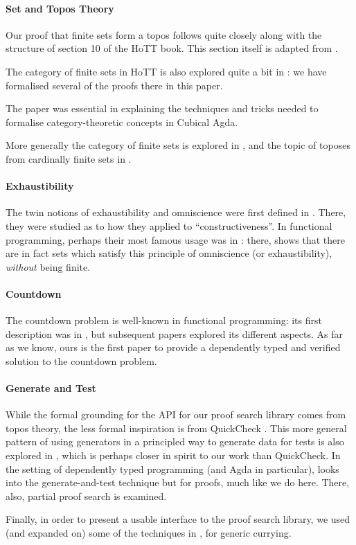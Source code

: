 \paragraph{Set and Topos Theory}
Our proof that finite sets form a topos follows quite closely along with the
structure of section 10 of the HoTT book.
This section itself is adapted from \cite{rijkeSetsHomotopyType2015}.

The category of finite sets in HoTT is also explored quite a bit in
\cite{yorgeyCombinatorialSpeciesLabelled2014}: we have formalised several of
the proofs there in this paper.

The paper \cite{iversenUnivalentCategoriesFormalization2018} was essential in
explaining the techniques and tricks needed to formalise category-theoretic
concepts in Cubical Agda.

More generally the category of finite sets is explored in
\cite{solovevCategoryFiniteSets1983}, and the topic of toposes from cardinally
finite sets in \cite{henryToposesGeneratedCardinal2018}.
\paragraph{Exhaustibility}
The twin notions of exhaustibility and omniscience were first defined in
\cite{bishopFoundationsConstructiveAnalysis1967}.
There, they were studied as to how they applied to ``constructiveness''.
In functional programming, perhaps their most famous usage was in
\cite{escardoInfiniteSetsThat2013}: there,
\citeauthor{escardoInfiniteSetsThat2013} shows that there are in fact sets which
satisfy this principle of omniscience (or exhaustibility), \emph{without} being
finite.
\paragraph{Countdown}
The countdown problem is well-known in functional programming: its first
description was in \cite{huttonCountdownProblem2002}, but subsequent papers
\cite{birdCountdownCaseStudy2005, birdFunctionalPearlTrouble2003}
explored its different aspects.
As far as we know,
ours is the first paper to provide a dependently typed and
verified solution to the countdown problem.
\paragraph{Generate and Test}
While the formal grounding for the API for our proof search library comes from
topos theory, the less formal inspiration is from QuickCheck
\cite{claessenQuickCheckLightweightTool2011}.
This more general pattern of using generators in a principled way to generate
data for tests is also explored in \cite{runcimanSmallCheckLazySmallCheck2008},
which is perhaps closer in spirit to our work than QuickCheck.
In the setting of dependently typed programming (and Agda in particular),
\cite{oconnorApplicationsApplicativeProof2016} looks into the generate-and-test
technique but for proofs, much like we do here.
There, also, partial proof search is examined.

Finally, in order to present a usable interface to the proof search library, we
used (and expanded on) some of the techniques in
\cite{allaisGenericLevelPolymorphic2019}, for generic currying.
